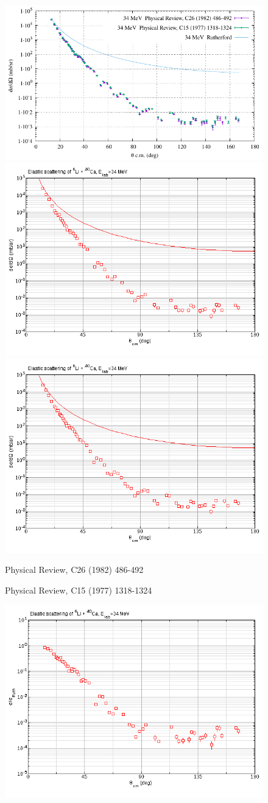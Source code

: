 \documentclass[a4paper, 12pt]{article}
\begin{document}
\begin{figure}%
	\centering
	\includegraphics[width=\linewidth]{figures/cmp-34mev-abs.pdf}
	\includegraphics[width=.49\linewidth]{figures/009-34mev-abs.png}
	\includegraphics[width=.49\linewidth]{figures/002-34mev-abs.png}
	\parbox{.49\linewidth}{\small\centering Physical Review, C26 (1982) 486-492}
	\parbox{.49\linewidth}{\small\centering Physical Review, C15 (1977) 1318-1324}
	\includegraphics[width=.49\linewidth]{figures/009-34mev-ratio.png}

\end{figure}
\end{document}
